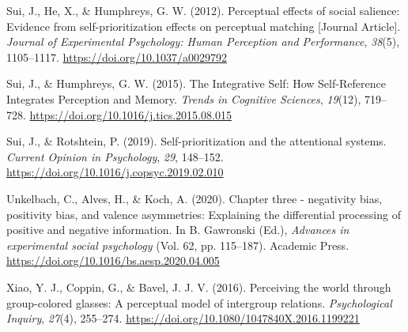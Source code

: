 \documentclass[
  man]{apa6}
\newlength{\cslhangindent}
\newlength{\cslentryspacingunit} %
\newenvironment{CSLReferences}[2] %
 {%
  \setlength{\parindent}{0pt}
  \ifodd #1
  \let\oldpar\par
  \def\par{\hangindent=\cslhangindent\oldpar}
  \fi
  \setlength{\parskip}{#2\cslentryspacingunit}
 }%
 {}
\begin{document}
\begin{CSLReferences}{1}{0}
\leavevmode{}%
Sui, J., He, X., \& Humphreys, G. W. (2012). Perceptual effects of social salience: Evidence from self-prioritization effects on perceptual matching {[}Journal Article{]}. \emph{Journal of Experimental Psychology: Human Perception and Performance}, \emph{38}(5), 1105--1117. \url{https://doi.org/10.1037/a0029792}

\leavevmode{}%
Sui, J., \& Humphreys, G. W. (2015). The {Integrative} {Self}: {How} {Self}-{Reference} {Integrates} {Perception} and {Memory}. \emph{Trends in Cognitive Sciences}, \emph{19}(12), 719--728. \url{https://doi.org/10.1016/j.tics.2015.08.015}

\leavevmode{}%
Sui, J., \& Rotshtein, P. (2019). Self-prioritization and the attentional systems. \emph{Current Opinion in Psychology}, \emph{29}, 148--152. \url{https://doi.org/10.1016/j.copsyc.2019.02.010}

\leavevmode{}%
Unkelbach, C., Alves, H., \& Koch, A. (2020). Chapter three - negativity bias, positivity bias, and valence asymmetries: Explaining the differential processing of positive and negative information. In B. Gawronski (Ed.), \emph{Advances in experimental social psychology} (Vol. 62, pp. 115--187). Academic Press. \url{https://doi.org/10.1016/bs.aesp.2020.04.005}

\leavevmode{}%
Xiao, Y. J., Coppin, G., \& Bavel, J. J. V. (2016). Perceiving the world through group-colored glasses: A perceptual model of intergroup relations. \emph{Psychological Inquiry}, \emph{27}(4), 255--274. \url{https://doi.org/10.1080/1047840X.2016.1199221}

\end{CSLReferences}

\endgroup
\end{document}

